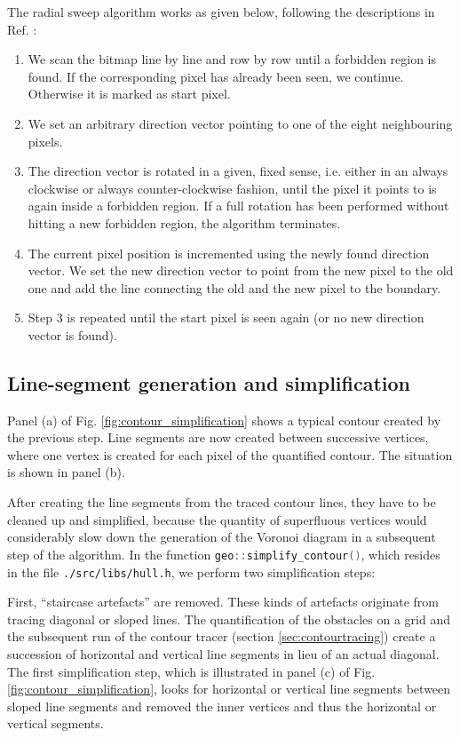 The radial sweep algorithm works as given below, following the descriptions in Ref. \cite{web_radial_sweep}:
\begin{enumerate}
	\item We scan the bitmap line by line and row by row until a forbidden region is found. 
		If the corresponding pixel has already been seen, we continue. Otherwise it is marked as start pixel.
	\item We set an arbitrary direction vector pointing to one of the eight neighbouring pixels.
	\item The direction vector is rotated in a given, fixed sense, i.e. either in an always clockwise or 
		always counter-clockwise fashion, until the pixel it points to is again inside a forbidden region.
		If a full rotation has been performed without hitting a new forbidden region, the algorithm terminates.
	\item The current pixel position is incremented using the newly found direction vector. 
		We set the new direction vector to point from the new pixel to the old one and
		add the line connecting the old and the new pixel to the boundary.
	\item Step 3 is repeated until the start pixel is seen again (or no new direction vector is found).
\end{enumerate}



\subsection{Line-segment generation and simplification}

Panel (a) of Fig. \ref{fig:contour_simplification} shows a typical contour created by the previous step.
Line segments are now created between successive vertices, where one vertex is created for each pixel of the
quantified contour. The situation is shown in panel (b).

After creating the line segments from the traced contour lines, they have to be cleaned up and simplified,
because the quantity of superfluous vertices would considerably slow down the generation of the Voronoi 
diagram in a subsequent step of the algorithm.
In the function \lstinline[language=C++]|geo::simplify_contour()|, which resides in the file \lstinline|./src/libs/hull.h|,
we perform two simplification steps:

First, ``staircase artefacts'' are removed. These kinds of artefacts originate from tracing diagonal or sloped lines.
The quantification of the obstacles on a grid and the subsequent run of the contour tracer (section \ref{sec:contourtracing})
create a succession of horizontal and vertical line segments in lieu of an actual diagonal.
The first simplification step, which is illustrated in panel (c) of Fig. \ref{fig:contour_simplification}, looks
for horizontal or vertical line segments between sloped line segments and removed the inner vertices and thus the
horizontal or vertical segments.

